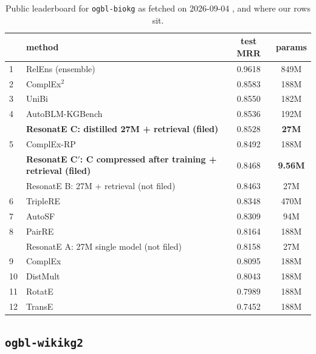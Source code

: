\documentclass[11pt,a4paper]{article}
\begin{document}
\begin{table}[t]
\centering
\caption{Public leaderboard for \texttt{ogbl-biokg} as fetched on
2026-09-04 \citep{ogbl_biokg_leaderboard}, and where our rows
sit.}
\label{tab:board}
\small
\begin{tabular}{llcc}
\toprule
 & method & test MRR & params \\
\midrule
1 & RelEns \citep{yue2023relens} (ensemble) & 0.9618 & 849M \\
2 & ComplEx$^2$ & 0.8583 & 188M \\
3 & UniBi & 0.8550 & 182M \\
4 & AutoBLM-KGBench \citep{zhang2022autoblm} & 0.8536 & 192M \\
  & \textbf{ResonatE C: distilled 27M + retrieval (filed)} & $\mathbf{0.8528}$ & \textbf{27M} \\
5 & ComplEx-RP \citep{chen2021relation} & 0.8492 & 188M \\
  & \textbf{ResonatE C$'$: C compressed after training + retrieval (filed)} & $\mathbf{0.8468}$ & \textbf{9.56M} \\
  & ResonatE B: 27M + retrieval (not filed) & 0.8463 & 27M \\
6 & TripleRE \citep{yu2021triplere} & 0.8348 & 470M \\
7 & AutoSF \citep{zhang2020autosf} & 0.8309 & 94M \\
8 & PairRE \citep{chao2021pairre} & 0.8164 & 188M \\
  & ResonatE A: 27M single model (not filed) & 0.8158 & 27M \\
9 & ComplEx \citep{trouillon2016complex} & 0.8095 & 188M \\
10 & DistMult \citep{yang2015distmult} & 0.8043 & 188M \\
11 & RotatE \citep{sun2019rotate} & 0.7989 & 188M \\
12 & TransE \citep{bordes2013transe} & 0.7452 & 188M \\
\bottomrule
\end{tabular}
\end{table}

\subsection{\texttt{ogbl-wikikg2}}
\end{document}
